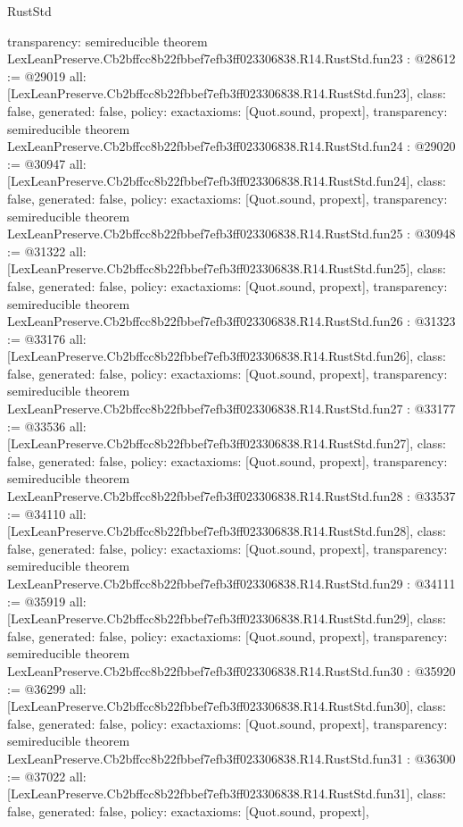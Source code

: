 \begin{lexlean}{RustStd}
\begin{coremodule}
{  transparency: semireducible
}
theorem LexLeanPreserve.Cb2bffcc8b22fbbef7efb3ff023306838.R14.RustStd.fun23 : @28612 := @29019 {
  all: [LexLeanPreserve.Cb2bffcc8b22fbbef7efb3ff023306838.R14.RustStd.fun23],
  class: false,
  generated: false,
  policy: exact{axioms: [Quot.sound, propext]},
  transparency: semireducible
}
theorem LexLeanPreserve.Cb2bffcc8b22fbbef7efb3ff023306838.R14.RustStd.fun24 : @29020 := @30947 {
  all: [LexLeanPreserve.Cb2bffcc8b22fbbef7efb3ff023306838.R14.RustStd.fun24],
  class: false,
  generated: false,
  policy: exact{axioms: [Quot.sound, propext]},
  transparency: semireducible
}
theorem LexLeanPreserve.Cb2bffcc8b22fbbef7efb3ff023306838.R14.RustStd.fun25 : @30948 := @31322 {
  all: [LexLeanPreserve.Cb2bffcc8b22fbbef7efb3ff023306838.R14.RustStd.fun25],
  class: false,
  generated: false,
  policy: exact{axioms: [Quot.sound, propext]},
  transparency: semireducible
}
theorem LexLeanPreserve.Cb2bffcc8b22fbbef7efb3ff023306838.R14.RustStd.fun26 : @31323 := @33176 {
  all: [LexLeanPreserve.Cb2bffcc8b22fbbef7efb3ff023306838.R14.RustStd.fun26],
  class: false,
  generated: false,
  policy: exact{axioms: [Quot.sound, propext]},
  transparency: semireducible
}
theorem LexLeanPreserve.Cb2bffcc8b22fbbef7efb3ff023306838.R14.RustStd.fun27 : @33177 := @33536 {
  all: [LexLeanPreserve.Cb2bffcc8b22fbbef7efb3ff023306838.R14.RustStd.fun27],
  class: false,
  generated: false,
  policy: exact{axioms: [Quot.sound, propext]},
  transparency: semireducible
}
theorem LexLeanPreserve.Cb2bffcc8b22fbbef7efb3ff023306838.R14.RustStd.fun28 : @33537 := @34110 {
  all: [LexLeanPreserve.Cb2bffcc8b22fbbef7efb3ff023306838.R14.RustStd.fun28],
  class: false,
  generated: false,
  policy: exact{axioms: [Quot.sound, propext]},
  transparency: semireducible
}
theorem LexLeanPreserve.Cb2bffcc8b22fbbef7efb3ff023306838.R14.RustStd.fun29 : @34111 := @35919 {
  all: [LexLeanPreserve.Cb2bffcc8b22fbbef7efb3ff023306838.R14.RustStd.fun29],
  class: false,
  generated: false,
  policy: exact{axioms: [Quot.sound, propext]},
  transparency: semireducible
}
theorem LexLeanPreserve.Cb2bffcc8b22fbbef7efb3ff023306838.R14.RustStd.fun30 : @35920 := @36299 {
  all: [LexLeanPreserve.Cb2bffcc8b22fbbef7efb3ff023306838.R14.RustStd.fun30],
  class: false,
  generated: false,
  policy: exact{axioms: [Quot.sound, propext]},
  transparency: semireducible
}
theorem LexLeanPreserve.Cb2bffcc8b22fbbef7efb3ff023306838.R14.RustStd.fun31 : @36300 := @37022 {
  all: [LexLeanPreserve.Cb2bffcc8b22fbbef7efb3ff023306838.R14.RustStd.fun31],
  class: false,
  generated: false,
  policy: exact{axioms: [Quot.sound, propext]},
}
\end{coremodule}
\end{lexlean}
